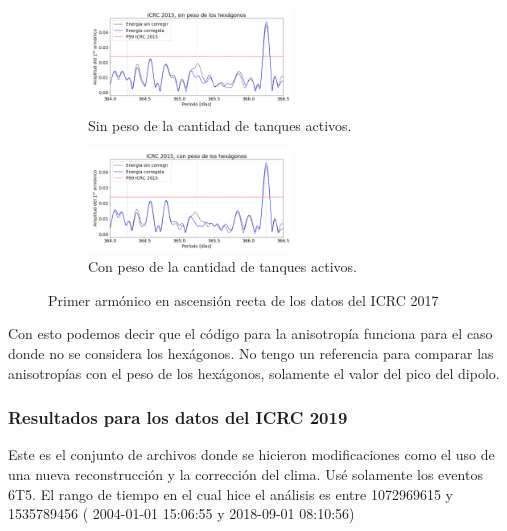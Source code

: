 				\begin{figure}[H]
				
					\begin{subfigure}[b]{\textwidth}
					\centering
						\includegraphics[width=0.6\textwidth]{../Anisotropia/ICRC/ICRC2017_Ecor_Eraw.png}
						\caption{Sin peso de la cantidad de tanques activos. } 	\label{fig:8EeV_sin_peso_ICRC2017_raw}
					\end{subfigure}%
				
					\begin{subfigure}[b]{\textwidth}
					\centering
						\includegraphics[width=0.6\textwidth]{../Anisotropia/ICRC/ICRC2017_Ecor_Eraw_hex.png}
						\caption{Con peso de la cantidad de tanques activos. } 	\label{fig:8EeV_sin_peso_ICRC2017_cor}
					\end{subfigure}
					\caption{Primer armónico en ascensión recta de los datos del ICRC 2017}
				\end{figure}

			Con esto podemos decir que el código para la anisotropía funciona para el caso donde no se considera los hexágonos. No tengo un referencia para comparar las anisotropías con el peso de los hexágonos, solamente el valor del pico del dipolo.

			\subsubsection{Resultados para los datos del ICRC 2019}
			
			Este es el conjunto de archivos donde se hicieron modificaciones como el uso de una nueva reconstrucción y la corrección del clima. Usé solamente los eventos 6T5. El rango de tiempo en el cual hice  el análisis es entre 1072969615 y 1535789456 (	2004-01-01 15:06:55 y 	2018-09-01 08:10:56)

